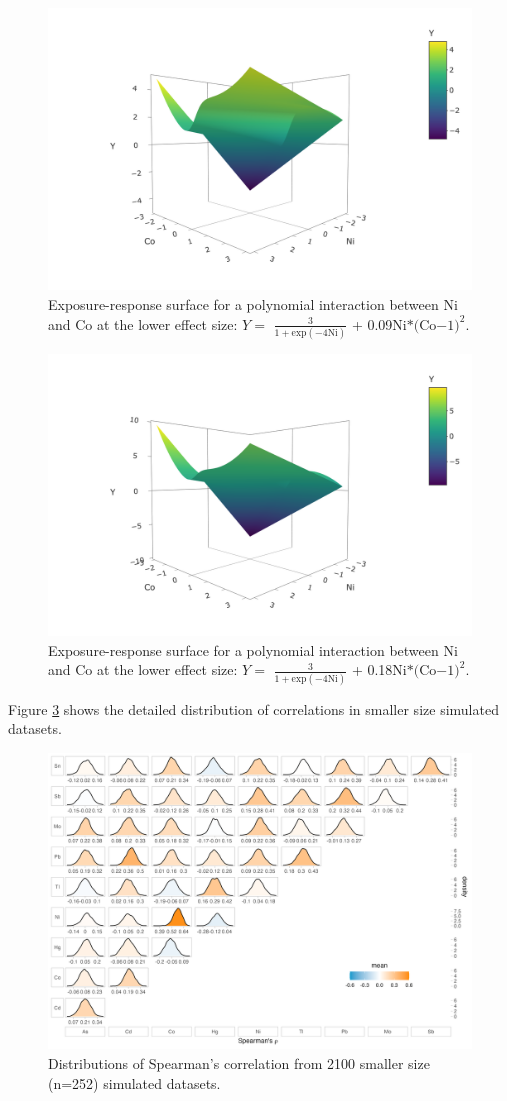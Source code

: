 \documentclass[12pt, twoside]{amherstthesis}
\begin{document}
\begin{figure}

{\centering \includegraphics[width=0.5\linewidth]{figures/surfaces/cp1} 

}

\caption{Exposure-response surface for a polynomial interaction between Ni and Co at the lower effect size: $Y=$ $\frac{3}{1+\textrm{exp}(-4\textrm{Ni})}$ + 0.09Ni$*($Co$-1)^2$.}\label{fig:cp1}
\end{figure}
\begin{figure}

{\centering \includegraphics[width=0.5\linewidth]{figures/surfaces/cp2} 

}

\caption{Exposure-response surface for a polynomial interaction between Ni and Co at the lower effect size: $Y=$ $\frac{3}{1+\textrm{exp}(-4\textrm{Ni})}$ + 0.18Ni$*($Co$-1)^2$.}\label{fig:cp2}
\end{figure}
Figure \ref{fig:cordistsm} shows the detailed distribution of correlations in smaller size simulated datasets.
\begin{figure}

{\centering \includegraphics[width=1\linewidth]{figures/ch4_corr_sim} 

}

\caption{Distributions of Spearman's correlation from 2100 smaller size (n=252) simulated datasets.}\label{fig:cordistsm}
\end{figure}
\end{document}
